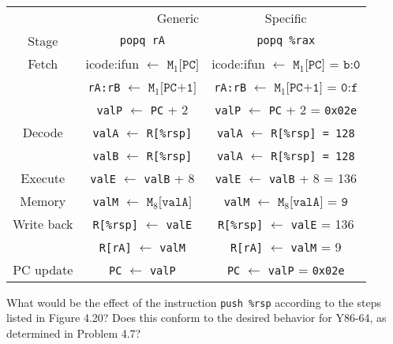\documentclass[12pt]{article}
\newenvironment{ex}[2][Exercise]{\begin{trivlist}
		\item[\hskip \labelsep {\bfseries #1}\hskip \labelsep {\bfseries #2.}]}{\end{trivlist}}
\newenvironment{sol}[1][Solution]{\begin{trivlist}
		\item[\hskip \labelsep {\bfseries #1:}]}{\end{trivlist}}
\begin{document}
\begin{sol}
	\
	\begin{center}
		\begin{tabular}{ccc}
			\multicolumn{2}{r}{Generic} & Specific\\
			Stage & \texttt{popq rA} & \texttt{popq \%rax}\\
			\hline
			Fetch &  icode:ifun $\leftarrow$ $\texttt{M}_1\texttt{[PC]}$ & 
			icode:ifun $\leftarrow$ $\texttt{M}_1\texttt{[PC] = b:0}$ \\
			
			{} & \texttt{rA:rB} $ \leftarrow$ $\texttt{M}_1\texttt{[PC+1]}$ & 
			\texttt{rA:rB} $ \leftarrow$ $\texttt{M}_1\texttt{[PC+1] = 0:f}$\\
			{} & \texttt{valP} $ \leftarrow$ \texttt{PC} + 2 &
			\texttt{valP} $ \leftarrow$ \texttt{PC} + 2 = \texttt{0x02e}\\
			
			Decode & \texttt{valA}  $\leftarrow$ \texttt{R[\%rsp]} &
			\texttt{valA}  $\leftarrow$ \texttt{R[\%rsp] = 128}\\
			
			{} & \texttt{valB}  $\leftarrow$ \texttt{R[\%rsp]} &
			\texttt{valA}  $\leftarrow$ \texttt{R[\%rsp] = 128}\\
			
			
			Execute & \texttt{valE} $\leftarrow$  \texttt{valB} + 8 & 
			\texttt{valE} $\leftarrow$  \texttt{valB} + 8 = 136\\
			Memory & \texttt{valM} $\leftarrow$ $\texttt{M}_8\texttt{[valA]}$ &
			\texttt{valM} $\leftarrow$ $\texttt{M}_8\texttt{[valA] = 9}$\\
			
			Write back & \texttt{R[\%rsp]} $ \leftarrow$ \texttt{valE} &
			\texttt{R[\%rsp]} $ \leftarrow$ \texttt{valE} = 136\\
			{} & \texttt{R[rA]} $\leftarrow$ \texttt{valM}&
			\texttt{R[rA]} $\leftarrow$ \texttt{valM} = 9\\
			
			PC update & \texttt{PC} $\leftarrow$ \texttt{valP} &
			 \texttt{PC} $\leftarrow$ \texttt{valP} = \texttt{0x02e}\\
		\end{tabular}
	\end{center}
\end{sol}

\begin{ex}{4.15}
	What would be the effect of the instruction \texttt{push \%rsp} according to
	the steps listed in Figure 4.20? Does this conform to the desired behavior for
	Y86-64, as determined in Problem 4.7?
\end{ex}
\end{document}

